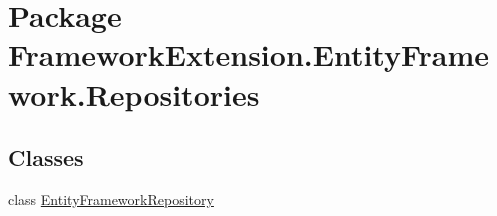 \hypertarget{namespace_framework_extension_1_1_entity_framework_1_1_repositories}{\section{Package Framework\-Extension.\-Entity\-Framework.\-Repositories}
\label{namespace_framework_extension_1_1_entity_framework_1_1_repositories}
}
\subsection*{Classes}
\begin{DoxyCompactItemize}
\item 
class \hyperlink{class_framework_extension_1_1_entity_framework_1_1_repositories_1_1_entity_framework_repository}{Entity\-Framework\-Repository}
\end{DoxyCompactItemize}
